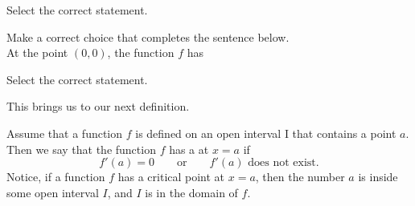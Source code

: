 \documentclass{ximera}
\begin{document}
  \begin{question}
Select the correct statement.
  \begin{multipleChoice}
  \end{multipleChoice}
\end{question}
\begin{question}
 Make a correct choice that completes the sentence below. \\
 
  At the point $(0,0)$, the  function $f$ has 

  \begin{multipleChoice}
  \end{multipleChoice}
  \end{question}
  \begin{question}
Select the correct statement.
  \begin{multipleChoice}
  \end{multipleChoice}
\end{question}

This brings us to our next definition.

\begin{definition}
  Assume that a function $f$ is defined on an open interval I that contains a point $a$. Then we say that the  function $f$ has a  at $x=a$ if 
  \[
  f'(a) = 0\qquad\text{or}\qquad \text{$f'(a)$ does not exist.}
  \]
 Notice, if a function $f$ has a critical point at $x=a$, then the number $a$ is inside some open interval $I$, and $I$ is in the  domain of $f$. 
 
\end{definition}
\end{document}
